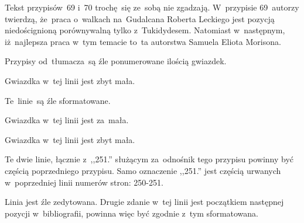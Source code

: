 \documentclass[a4paper,11pt]{article}
\begin{document}
\vspace{\spaceFour}


\start {} Tekst przypisów~69 i~70 trochę~się ze~sobą nie
zgadzają. W~przypisie 69~autorzy twierdzą, że~praca o~walkach
na~Gudalcana Roberta Leckiego jest pozycją niedoścignioną porównywalną
tylko z~Tukidydesem. Natomiast w~następnym, iż~najlepsza praca w~tym
temacie to~ta autorstwa Samuela Eliota Morisona.

\vspace{\spaceFour}


\start {} Przypisy od~tłumacza~są źle ponumerowane ilością
gwiazdek.

\vspace{\spaceFour}


\start {} Gwiazdka w~tej linii jest zbyt mała.

\vspace{\spaceFour}


\start {} Te~linie~są źle sformatowane.

\vspace{\spaceFour}


\start {} Gwiazdka w~tej linii jest za~mała.

\vspace{\spaceFour}


\start {} Gwiazdka w~tej linii jest zbyt mała.

\vspace{\spaceFour}


\start {} Te dwie linie, łącznie z~,,251.'' służącym
za~odnośnik tego przypisu powinny być częścią poprzedniego przypisu.
Samo oznaczenie ,,251.'' jest częścią urwanych w~poprzedniej linii
numerów stron: 250-251.

\vspace{\spaceFour}


\start {} Linia jest źle zedytowana. Drugie zdanie w~tej
linii jest początkiem następnej pozycji w~bibliografii, powinna więc
być zgodnie z~tym sformatowana.

\vspace{\spaceFour}
\end{document}
